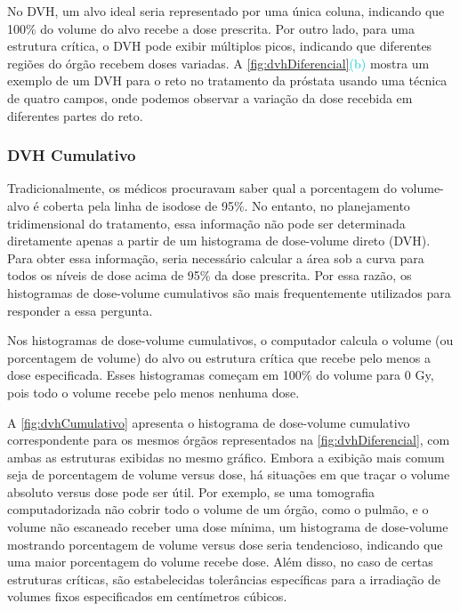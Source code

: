 \documentclass[11pt,a4paper]{article}
\newcounter{exemplo}
\begin{document}
	No DVH, um alvo ideal seria representado por uma única coluna, indicando que 100\% do volume do alvo recebe a dose prescrita. Por outro lado, para uma estrutura crítica, o DVH pode exibir múltiplos picos, indicando que diferentes regiões do órgão recebem doses variadas. A \ref{fig:dvhDiferencial}\textcolor{DarkTurquoise}{(b)} mostra um exemplo de um DVH para o reto no tratamento da próstata usando uma técnica de quatro campos, onde podemos observar a variação da dose recebida em diferentes partes do reto.

\subsubsection*{DVH Cumulativo}

	Tradicionalmente, os médicos procuravam saber qual a porcentagem do volume-alvo é coberta pela linha de isodose de 95\%. No entanto, no planejamento tridimensional do tratamento, essa informação não pode ser determinada diretamente apenas a partir de um histograma de dose-volume direto (DVH). Para obter essa informação, seria necessário calcular a área sob a curva para todos os níveis de dose acima de 95\% da dose prescrita. Por essa razão, os histogramas de dose-volume cumulativos são mais frequentemente utilizados para responder a essa pergunta.

	Nos histogramas de dose-volume cumulativos, o computador calcula o volume (ou porcentagem de volume) do alvo ou estrutura crítica que recebe pelo menos a dose especificada. Esses histogramas começam em 100\% do volume para 0 Gy, pois todo o volume recebe pelo menos nenhuma dose.	

	A \ref{fig:dvhCumulativo} apresenta o histograma de dose-volume cumulativo correspondente para os mesmos órgãos representados na \ref{fig:dvhDiferencial}, com ambas as estruturas exibidas no mesmo gráfico. Embora a exibição mais comum seja de porcentagem de volume versus dose, há situações em que traçar o volume absoluto versus dose pode ser útil. Por exemplo, se uma tomografia computadorizada não cobrir todo o volume de um órgão, como o pulmão, e o volume não escaneado receber uma dose mínima, um histograma de dose-volume mostrando porcentagem de volume versus dose seria tendencioso, indicando que uma maior porcentagem do volume recebe dose. Além disso, no caso de certas estruturas críticas, são estabelecidas tolerâncias específicas para a irradiação de volumes fixos especificados em centímetros cúbicos.
\end{document}
